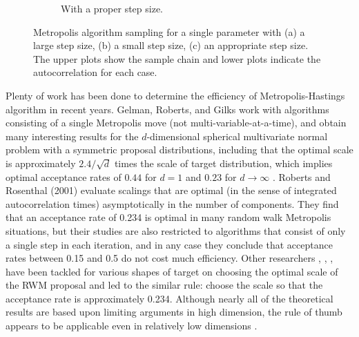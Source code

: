 \begin{figure}[h]
\begin{subfigure}[b]{0.32\textwidth}
    \caption{With a proper step size.}
\end{subfigure}
\caption{Metropolis algorithm sampling for a single parameter with (a) a large step size, (b) a small step size, (c) an appropriate step size. The upper plots show the sample chain and lower plots indicate the autocorrelation for each case.}
\label{largesmallstepsize}
\end{figure}


Plenty of work has been done to determine the efficiency of Metropolis-Hastings algorithm in recent years. Gelman, Roberts, and Gilks \cite{gelman1996efficient} work with algorithms consisting of a single Metropolis move (not multi-variable-at-a-time), and obtain many interesting results for the $d$-dimensional spherical multivariate normal problem with a symmetric proposal distributions, including that the optimal scale is approximately $2.4/\sqrt{d}$ times the scale of target distribution, which implies optimal acceptance rates of $0.44$ for $d = 1$ and $0.23$ for $d\rightarrow \infty$ \cite{gilks1995markov}. Roberts and Rosenthal (2001) \cite{roberts2001optimal} evaluate scalings that are optimal (in the sense of integrated autocorrelation times) asymptotically in the number of components. They find that an acceptance rate of 0.234 is optimal in many random walk Metropolis situations, but their studies are also restricted to algorithms that consist of only a single step in each iteration, and in any case they conclude that acceptance rates between 0.15 and 0.5 do not cost much efficiency. Other researchers \cite{roberts1997weak} \cite{bedard2007weak}, \cite{beskos2009optimal}, \cite{sherlock2009optimal}, \cite{sherlock2013optimal} have been tackled for various shapes of target on choosing the optimal scale of the RWM proposal and led to the similar rule: choose the scale so that the acceptance rate is approximately 0.234. Although nearly all of the theoretical results are based upon limiting arguments in high dimension, the rule of thumb appears to be applicable even in relatively low dimensions \cite{sherlock2010random}. 



